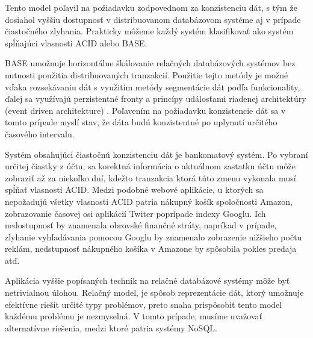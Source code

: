 \documentclass[11pt,twoside,a4paper]{book}
\begin{document}
Tento model poľavil na požiadavku zodpovednom za konzistenciu dát, s tým že dosiahol vyššiu dostupnosť v distribuovanom databázovom systéme aj v prípade čiastočného zlyhania. Prakticky môžeme každý systém klasifikovať ako systém spĺňajúci vlasnosti ACID alebo BASE.

BASE umožnuje horizontálne škálovanie relačných databázových systémov bez nutnosti použitia distribuovaných tranzakcií. Použitie tejto metódy je možné vďaka rozsekávaniu dát s využitím metódy segmentácie dát podľa funkcionality, ďalej sa využívajú perzistentné fronty a princípy událosťami riadenej architektúry (event driven architekture) \cite{clanokBASE}. Poľavením na požiadavku konzistencie dát sa v tomto prípade myslí stav, že dáta budú konzistentné po uplynutí určitého časového intervalu. 

Systém obsahujúci čiastočnú konzistenciu dát je bankomatový systém. Po vybraní určitej čiastky z účtu, sa korektná informácia o aktuálnom zastatku účtu môže zobraziť až za niekoľko dní, kdežto tranzakcia ktorá túto zmenu vykonala musí spĺňať vlasnosti ACID. Medzi podobné webové aplikácie, u ktorých sa nepožadujú všetky vlasnosti ACID patria nákupný košík spoločnosti Amazon, zobrazovanie časovej osi aplikácií Twiter poprípade indexy Googlu. Ich nedostupnosť by znamenala obrovské finančné stráty, napríkad v prípade, zlyhanie vyhľadávania pomocou Googlu by znamenalo zobrazenie nižšieho počtu reklám, nedstupnosť nákupného košíka v Amazone by spôsobila pokles predaja atď.

Aplikácia vyššie popísaných techník na relačné databázové systémy môže byť netrivialnou úlohou. Relačný model, je spôsob reprezentácie dát, ktorý umožnuje efektívne riešit určité typy problémov, preto snaha prispôsobiť tento model každému problému je nezmyselná. V tomto prípade, musíme uvažovať alternatívne riešenia, medzi ktoré patria systémy NoSQL.



\end{document}

